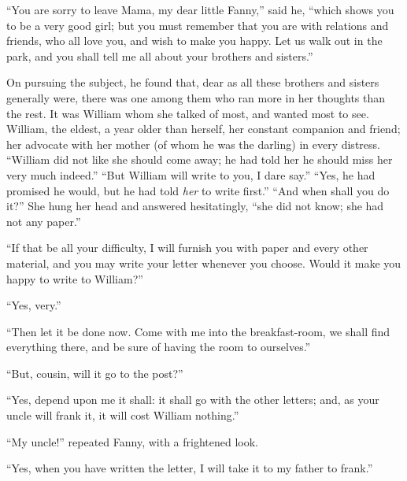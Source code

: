 \documentclass{article}
\begin{document}
``You are sorry to leave Mama, my dear little Fanny,''
said he, ``which shows you to be a very good girl; but you
must remember that you are with relations and friends,
who all love you, and wish to make you happy.  Let us walk
out in the park, and you shall tell me all about your
brothers and sisters.''

On pursuing the subject, he found that, dear as all
these brothers and sisters generally were, there was one
among them who ran more in her thoughts than the rest.
It was William whom she talked of most, and wanted most
to see.  William, the eldest, a year older than herself,
her constant companion and friend; her advocate with her
mother (of whom he was the darling) in every distress.
``William did not like she should come away; he had told
her he should miss her very much indeed.''  ``But William will
write to you, I dare say.''  ``Yes, he had promised he would,
but he had told \emph{her} to write first.''  ``And when shall
you do it?''  She hung her head and answered hesitatingly,
``she did not know; she had not any paper.''

``If that be all your difficulty, I will furnish you
with paper and every other material, and you may write
your letter whenever you choose.  Would it make you
happy to write to William?''

``Yes, very.''

``Then let it be done now.  Come with me into the
breakfast-room, we shall find everything there,
and be sure of having the room to ourselves.''

``But, cousin, will it go to the post?''

``Yes, depend upon me it shall:  it shall go with the
other letters; and, as your uncle will frank it,
it will cost William nothing.''

``My uncle!'' repeated Fanny, with a frightened look.

``Yes, when you have written the letter, I will take it
to my father to frank.''
\end{document}
